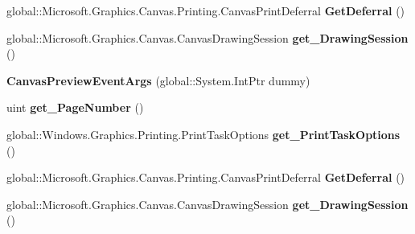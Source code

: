 \begin{DoxyCompactItemize}
global\+::\+Microsoft.\+Graphics.\+Canvas.\+Printing.\+Canvas\+Print\+Deferral {\bfseries Get\+Deferral} ()
\item 
\mbox{\label{class_microsoft_1_1_graphics_1_1_canvas_1_1_printing_1_1_canvas_preview_event_args_afa5a185414d95a547b3b8d6de45864d6}} 
global\+::\+Microsoft.\+Graphics.\+Canvas.\+Canvas\+Drawing\+Session {\bfseries get\+\_\+\+Drawing\+Session} ()
\item 
\mbox{\label{class_microsoft_1_1_graphics_1_1_canvas_1_1_printing_1_1_canvas_preview_event_args_adfb508d68950ca5e6aba4bcb1b16375d}} 
{\bfseries Canvas\+Preview\+Event\+Args} (global\+::\+System.\+Int\+Ptr dummy)
\item 
\mbox{\label{class_microsoft_1_1_graphics_1_1_canvas_1_1_printing_1_1_canvas_preview_event_args_ae09b4efa9f3c47599cc48d99dc8f71f2}} 
uint {\bfseries get\+\_\+\+Page\+Number} ()
\item 
\mbox{\label{class_microsoft_1_1_graphics_1_1_canvas_1_1_printing_1_1_canvas_preview_event_args_a62407eb61c4c702e3649d979f1eda285}} 
global\+::\+Windows.\+Graphics.\+Printing.\+Print\+Task\+Options {\bfseries get\+\_\+\+Print\+Task\+Options} ()
\item 
\mbox{\label{class_microsoft_1_1_graphics_1_1_canvas_1_1_printing_1_1_canvas_preview_event_args_a877d99bbaa60578acf4e13109782c656}} 
global\+::\+Microsoft.\+Graphics.\+Canvas.\+Printing.\+Canvas\+Print\+Deferral {\bfseries Get\+Deferral} ()
\item 
\mbox{\label{class_microsoft_1_1_graphics_1_1_canvas_1_1_printing_1_1_canvas_preview_event_args_afa5a185414d95a547b3b8d6de45864d6}} 
global\+::\+Microsoft.\+Graphics.\+Canvas.\+Canvas\+Drawing\+Session {\bfseries get\+\_\+\+Drawing\+Session} ()
\item 
\mbox{\label{class_microsoft_1_1_graphics_1_1_canvas_1_1_printing_1_1_canvas_preview_event_args_adfb508d68950ca5e6aba4bcb1b16375d}} 

\end{DoxyCompactItemize}
